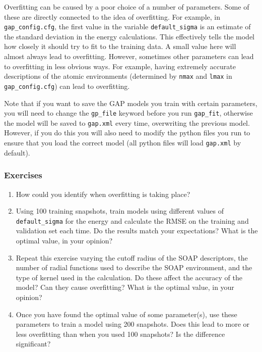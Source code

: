 \documentclass{article}
\begin{document}
Overfitting can be caused by a poor choice of a number of parameters. Some of these are directly connected to the idea of overfitting. For example, in \verb|gap_config.cfg|, the first value in the variable \verb|default_sigma| is an estimate of the standard deviation in the energy calculations. This effectively tells the model how closely it should try to fit to the training data. A small value here will almost always lead to overfitting. However, sometimes other parameters can lead to overfitting in less obvious ways. For example, having extremely accurate descriptions of the atomic environments (determined by \verb|nmax| and \verb|lmax| in \verb|gap_config.cfg|) can lead to overfitting.

Note that if you want to save the GAP models you train with certain parameters, you will need to change the \verb|gp_file| keyword before you run \verb|gap_fit|, otherwise the model will be saved to \verb|gap.xml| every time, overwriting the previous model. However, if you do this you will also need to modify the python files you run to ensure that you load the correct model (all python files will load \verb|gap.xml| by default).

\subsubsection*{Exercises}

\begin{enumerate}
\item How could you identify when overfitting is taking place?
\item Using 100 training snapshots, train models using different values of \verb|default_sigma| for the energy and calculate the RMSE on the training and validation set each time. Do the results match your expectations? What is the optimal value, in your opinion?
\item Repeat this exercise varying the cutoff radius of the SOAP descriptors, the number of radial functions used to describe the SOAP environment, and the type of kernel used in the calculation. Do these affect the accuracy of the model? Can they cause overfitting? What is the optimal value, in your opinion?
\item Once you have found the optimal value of some parameter(s), use these parameters to train a model using 200 snapshots. Does this lead to more or less overfitting than when you used 100 snapshots? Is the difference significant?

\end{enumerate}
\end{document}
